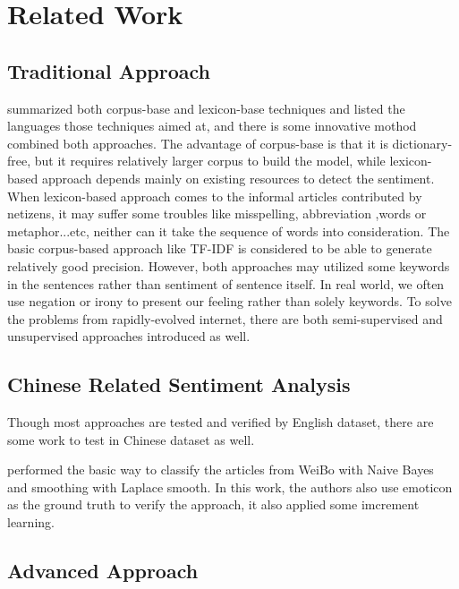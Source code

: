 \chapter{Related Work}


\section{Traditional Approach}

\cite{Dashtipour2016} summarized both corpus-base and lexicon-base techniques and listed the languages those techniques aimed at, and there is some innovative mothod combined both approaches. 
The advantage of corpus-base is that it is dictionary-free, but it requires relatively larger corpus to build the model, while lexicon-based approach depends mainly on existing resources to detect the sentiment.
When lexicon-based approach comes to the informal articles contributed by netizens, it may suffer some troubles like misspelling, abbreviation ,words or metaphor...etc, neither can it take the sequence of words into consideration.   
The basic corpus-based approach like TF-IDF is considered to be able to generate relatively good precision.
However, both approaches may utilized some keywords in the sentences rather than sentiment of sentence itself. In real world, we often use negation or irony to present our feeling rather than solely keywords. 
To solve the problems from rapidly-evolved internet, there are both semi-supervised and unsupervised approaches introduced as well. 

\section{Chinese Related Sentiment Analysis}

Though most approaches are tested and verified by English dataset, there are some work to test in Chinese dataset as well.

\cite{zhao2012moodlens} performed the basic way to classify the articles from WeiBo with Naive Bayes and smoothing with Laplace smooth.  
In this work, the authors also use emoticon as the ground truth to verify the approach, it also applied some imcrement learning. \\


\section{Advanced Approach}

